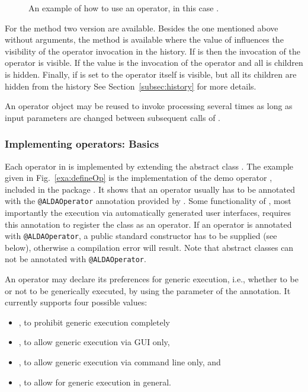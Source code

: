 \begin{figure}[hb]

\caption{\label{exa:useop}An example of how to use an operator, in this case
	.}
\end{figure}

For the  method two version are available.
Besides the one mentioned above without arguments,
the method  is available where the value of
 influences the visibility of the operator invocation in the
history.
If  is  then the invocation of the operator
is visible.
If the value is  the invocation of the operator and all is children is hidden.
Finally, if  is set to  the operator itself is visible,
but all its children are hidden from the history
See Section~\ref{subsec:history} for more details.

An operator object may be reused to invoke processing
several times as long as input parameters are changed between
subsequent calls of .

\subsubsection{Implementing operators: Basics}
\label{subsubsec:implOperators-basics}

Each operator in \alida is implemented by extending the abstract class .
The example given in Fig.~\ref{exa:defineOp}
is the implementation of the demo operator ,
included in the package .
It
shows
that an operator usually has to be annotated with the \texttt{@ALDAOperator}
annotation provided by \alida.
Some functionality of \alida, most importantly the  execution via automatically generated user interfaces,
 requires this annotation
to register the class as an \alida operator.
If an operator is annotated with \texttt{@ALDAOperator}, a public standard
constructor has to be supplied (see below), otherwise a compilation error will result.
Note that abstract classes can not be annotated with \texttt{@ALDAOperator}.

An operator may declare its preferences for generic execution, i.e., whether to
be or not to be generically executed, by using the parameter
 of the annotation. It currently supports four
possible values:
\begin{itemize}
\item {}, to prohibit generic execution completely
\item {}, to allow generic execution via GUI only,
\item {}, to allow generic execution via command line only, and
\item {}, to allow for generic execution in general.
\end{itemize}

